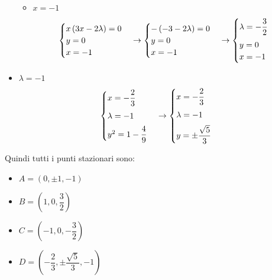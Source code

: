 \documentclass[a4paper]{article}
\begin{document}
\begin{itemize}
\begin{itemize}
			\item $x = -1$
			\begin{equation*}
				\begin{cases}
					x\left(3x - 2\lambda\right) = 0 \\
					y = 0 \\
					x = -1
				\end{cases}
				\rightarrow
				\begin{cases}
					-\left(-3 - 2\lambda\right) = 0 \\
					y = 0 \\
					x = -1
				\end{cases}
				\rightarrow
				\begin{cases}
					\lambda = -\dfrac{3}{2} \vspace{.5em}\\
					y = 0 \\
					x = -1
				\end{cases}
			\end{equation*}
		\end{itemize}

		\item $\lambda = -1$
		\begin{equation*}
			\begin{cases}
				x = -\dfrac{2}{3} \vspace{.5em} \\
				\lambda = -1 \vspace{.5em} \\
				y^{2} = 1-\dfrac{4}{9}
			\end{cases}
			\rightarrow
			\begin{cases}
				x = -\dfrac{2}{3} \vspace{.5em} \\
				\lambda = -1 \vspace{.5em} \\
				y = \pm \dfrac{\sqrt{5}}{3}
			\end{cases}
		\end{equation*}
	\end{itemize}
	Quindi tutti i punti stazionari sono:
	\begin{multicols}{2}
		\begin{itemize}
			\item $A = \left(0, \pm 1, -1\right)$
			\item $B = \left(1, 0, \dfrac{3}{2}\right)$
			\item $C = \left(-1, 0, -\dfrac{3}{2}\right)$
			\item $D = \left(-\dfrac{2}{3}, \pm\dfrac{\sqrt{5}}{3}, -1\right)$
		\end{itemize}
	\end{multicols}
\end{document}

